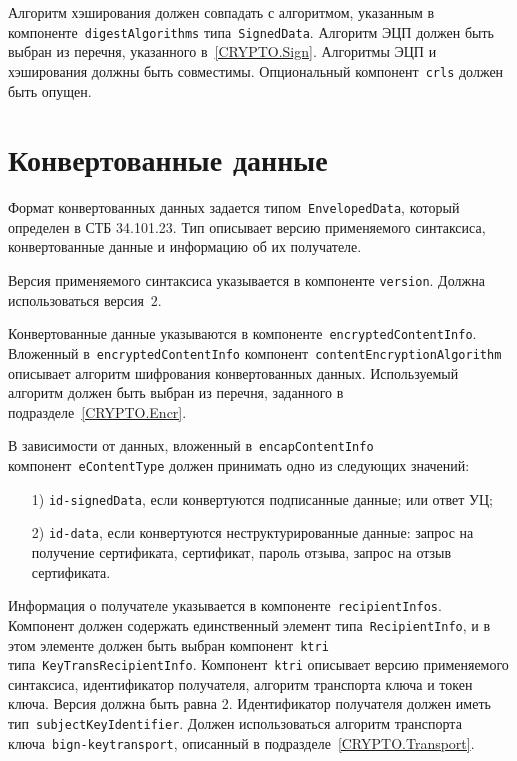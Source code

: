 Алгоритм хэширования должен
совпадать с алгоритмом, указанным в компоненте~\texttt{digestAlgorithms}
типа~\texttt{SignedData}. Алгоритм ЭЦП должен быть выбран из перечня,
указанного в~\ref{CRYPTO.Sign}. Алгоритмы ЭЦП и хэширования должны быть
совместимы. Опциональный компонент~\texttt{crls} должен быть опущен.

\section{Конвертованные данные}\label{FMT.EnvelopedData}

Формат конвертованных данных задается типом~\texttt{EnvelopedData}, который
определен в СТБ 34.101.23. Тип описывает версию применяемого синтаксиса,
конвертованные данные и информацию об их получателе.

Версия применяемого синтаксиса указывается в компоненте
\texttt{version}. Должна использоваться версия~$2$.

Конвертованные данные указываются в компоненте~\texttt{encryptedContentInfo}.
%
Вложенный в~\texttt{encryptedContentInfo} компонент~\texttt{contentEncryptionAlgorithm}
описывает алгоритм шифрования конвертованных данных. Используемый алгоритм 
должен быть выбран из перечня, заданного в подразделе~\ref{CRYPTO.Encr}.

В зависимости от  данных, вложенный 
в~\texttt{encapContentInfo} компонент~\texttt{eContentType} 
должен принимать одно из следующих значений:
\begin{enumerate}
\item[1)]
\texttt{id-signedData}, если конвертуются подписанные данные;
или ответ УЦ; 
\item[2)]
\texttt{id-data}, если конвертуются неструктурированные данные:
запрос на получение сертификата,
сертификат, пароль отзыва, запрос на отзыв сертификата. 
\end{enumerate}




Информация о получателе указывается в компоненте~\texttt{recipientInfos}.
Компонент должен содержать единственный элемент 
типа~\texttt{RecipientInfo}, и в этом элементе должен быть выбран  
компонент~\texttt{ktri} типа~\texttt{KeyTransRecipientInfo}.  
Компонент~\texttt{ktri} описывает версию применяемого синтаксиса, 
идентификатор получателя, алгоритм транспорта ключа и токен ключа. 
Версия должна быть равна 2. Идентификатор получателя должен 
иметь тип~\texttt{subjectKeyIdentifier}. Должен использоваться алгоритм 
транспорта ключа~\texttt{bign-keytransport}, описанный в 
подразделе~\ref{CRYPTO.Transport}.

